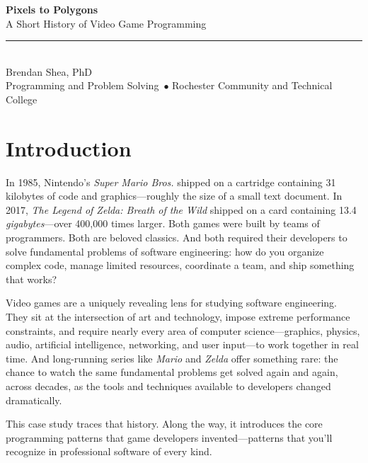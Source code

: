 \documentclass[11pt,letterpaper]{article}
\newcommand{\cstitle}{Pixels to Polygons}
\newcommand{\cssubtitle}{A Short History of Video Game Programming}
\newcommand{\csauthor}{Brendan Shea, PhD}
\newcommand{\cscourse}{Programming and Problem Solving}
\newcommand{\csinstitution}{Rochester Community and Technical College}
\begin{document}
\begin{tcolorbox}[
    enhanced,
    colback=csprimary,
    colframe=csprimary,
    arc=0mm,
    left=10mm, right=10mm, top=8mm, bottom=8mm
]
\begin{center}
    {\huge\bfseries\color{white}\cstitle}\\[3mm]
    {\Large\color{cslight}\cssubtitle}\\[5mm]
    \textcolor{cssecondary}{\rule{0.5\textwidth}{1pt}}\\[5mm]
    {\large\color{white}\csauthor}\\[2mm]
    {\normalsize\color{cslight}\cscourse\ $\bullet$ \csinstitution}
\end{center}
\end{tcolorbox}

\vspace{5mm}

\section*{Introduction}

In 1985, Nintendo's \textit{Super Mario Bros.} shipped on a cartridge containing 31 kilobytes of code and graphics---roughly the size of a small text document. In 2017, \textit{The Legend of Zelda: Breath of the Wild} shipped on a card containing 13.4 \textit{gigabytes}---over 400,000 times larger. Both games were built by teams of programmers. Both are beloved classics. And both required their developers to solve fundamental problems of software engineering: how do you organize complex code, manage limited resources, coordinate a team, and ship something that works?

Video games are a uniquely revealing lens for studying software engineering. They sit at the intersection of art and technology, impose extreme performance constraints, and require nearly every area of computer science---graphics, physics, audio, artificial intelligence, networking, and user input---to work together in real time. And long-running series like \textit{Mario} and \textit{Zelda} offer something rare: the chance to watch the same fundamental problems get solved again and again, across decades, as the tools and techniques available to developers changed dramatically.

This case study traces that history. Along the way, it introduces the core programming patterns that game developers invented---patterns that you'll recognize in professional software of every kind.
\end{document}
